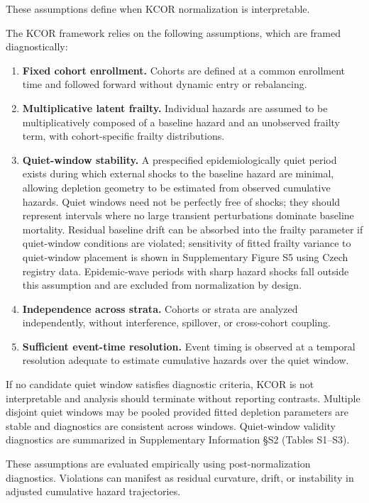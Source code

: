 \documentclass[
]{article}
\begin{document}
These assumptions define when KCOR normalization is interpretable.

The KCOR framework relies on the following assumptions, which are framed diagnostically:

\begin{enumerate}
\def\labelenumi{\arabic{enumi}.}
\item
  \textbf{Fixed cohort enrollment.} Cohorts are defined at a common enrollment time and followed forward without dynamic entry or rebalancing.
\item
  \textbf{Multiplicative latent frailty.} Individual hazards are assumed to be multiplicatively composed of a baseline hazard and an unobserved frailty term, with cohort-specific frailty distributions.
\item
  \textbf{Quiet-window stability.} A prespecified epidemiologically quiet period exists during which external shocks to the baseline hazard are minimal, allowing depletion geometry to be estimated from observed cumulative hazards. Quiet windows need not be perfectly free of shocks; they should represent intervals where no large transient perturbations dominate baseline mortality. Residual baseline drift can be absorbed into the frailty parameter if quiet-window conditions are violated; sensitivity of fitted frailty variance to quiet-window placement is shown in Supplementary Figure S5 using Czech registry data. Epidemic-wave periods with sharp hazard shocks fall outside this assumption and are excluded from normalization by design.
\item
  \textbf{Independence across strata.} Cohorts or strata are analyzed independently, without interference, spillover, or cross-cohort coupling.
\item
  \textbf{Sufficient event-time resolution.} Event timing is observed at a temporal resolution adequate to estimate cumulative hazards over the quiet window.
\end{enumerate}

If no candidate quiet window satisfies diagnostic criteria, KCOR is not interpretable and analysis should terminate without reporting contrasts. Multiple disjoint quiet windows may be pooled provided fitted depletion parameters are stable and diagnostics are consistent across windows. Quiet-window validity diagnostics are summarized in Supplementary Information §S2 (Tables S1--S3).

These assumptions are evaluated empirically using post-normalization diagnostics. Violations can manifest as residual curvature, drift, or instability in adjusted cumulative hazard trajectories.
\end{document}
